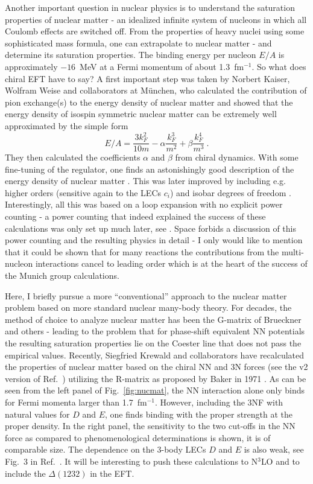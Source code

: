 \documentclass[a4paper,fleqn]{scrartcl}
\newcommand{\beq}{\begin{equation}}
\newcommand{\eeq}{\end{equation}}
\begin{document}
{Another important question in nuclear physics is to understand the 
saturation properties of nuclear matter - an idealized infinite
system of nucleons in which all Coulomb effects are switched off.
From the properties of heavy nuclei using some sophisticated mass
formula, one can extrapolate to nuclear matter - and determine its
saturation properties. The binding energy per nucleon $E/A$ is
approximately $-16\,$ MeV at a Fermi momentum of about 1.3~fm$^{-1}$.
So what does chiral EFT have to say? A first important step was taken
by Norbert Kaiser, Wolfram Weise and collaborators at M\"unchen, 
who calculated the contribution of pion exchange(s) to the energy
density of nuclear matter and showed that the energy density of 
isospin symmetric nuclear
matter can be extremely well approximated by the simple form
\beq
E/A = \frac{3k_F^2}{10m} - \alpha \frac{k_F^3}{m^2} + \beta
\frac{k_F^4}{m^3}~.
\eeq 
They then calculated the coefficients $\alpha$ and $\beta$ from chiral 
dynamics. With some fine-tuning of the  regulator, one
finds an astonishingly good description of the energy density of
nuclear matter \cite{Kaiser:2001jx}. This was later improved by
including e.g. higher orders (sensitive again to the LECs $c_i$)
and isobar degrees of freedom \cite{Fritsch:2004nx}. Interestingly,
all this was based on a loop expansion with no explicit power 
counting - a power counting that indeed explained the success of
these calculations was only set up much later, see \cite{Oller:2009zt}.
Space forbids a discussion of this power counting and the resulting
physics in detail - I only would like to mention that it could be
shown that for many reactions the contributions from the multi-nucleon
interactions cancel to leading order which is at the heart of the
success of the Munich group calculations.

Here, I briefly pursue a more ``conventional'' approach to the nuclear
matter problem based on more standard nuclear many-body theory. For decades,
the method of choice to analyze nuclear matter has been the G-matrix
of Brueckner and others - leading to the problem that for phase-shift
equivalent NN potentials the resulting  saturation properties lie
on the Coester line that does not pass the empirical values. Recently,
Siegfried Krewald and collaborators have recalculated the properties of 
nuclear matter based on the chiral 
NN and 3N forces (see the v2 version of Ref.~\cite{Saviankou:2008tg})
utilizing the R-matrix as proposed by Baker in 1971
\cite{Baker:1971vm}. As can be seen from the left panel of
Fig.~\ref{fig:nucmat}, the NN interaction alone  only binds
for Fermi momenta larger than 1.7~fm$^{-1}$. However, including the
3NF with natural values for $D$ and $E$, one finds binding with the
proper strength at the proper density. In the right panel, the
sensitivity to the two cut-offs in the NN force as compared to
phenomenological determinations is shown, it is of comparable size.
The dependence on the 3-body LECs $D$ and $E$ is also weak, see
Fig.~3 in Ref.~\cite{Saviankou:2008tg}. It will be interesting to push these
calculations to N$^3$LO and to include the $\Delta(1232)$ in the EFT.

}
\end{document}
